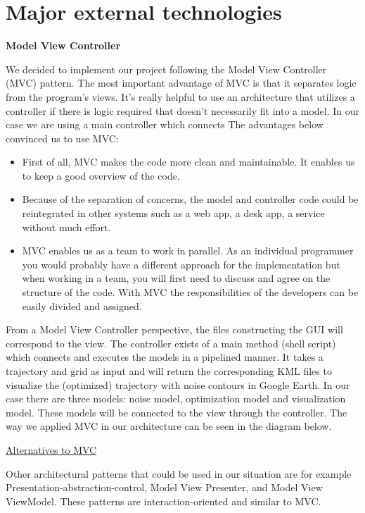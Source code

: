 \section{Major external technologies}

\textbf{Model View Controller} 

We decided to implement our project following the Model View Controller (MVC) pattern. The most important advantage of MVC is that it separates logic from the program's views. It's really helpful to use an architecture that utilizes a controller if there is logic required that doesn't necessarily fit into a model. In our case we are using a main controller which connects The advantages below convinced us to use MVC:


\begin{itemize}
\item First of all, MVC makes the code more clean and maintainable. It enables us to keep a good overview of the code.


\item Because of the separation of concerns, the model and controller code could be reintegrated in other systems such as a web app, a desk app, a service without much effort.


\item MVC enables us as a team to work in parallel. As an individual programmer you would probably have a different approach for the implementation but when working in a team, you will first need to discuss and agree on the structure of the code. With MVC the responsibilities of the developers can be easily divided and assigned.

\end{itemize}

From a Model View Controller perspective, the files constructing the GUI will correspond to the view. The controller exists of a main method (shell script) which connects and executes the models in a pipelined manner. It takes a trajectory and grid as input and will return the corresponding KML files to visualize the (optimized) trajectory with noise contours in Google Earth. In our case there are three models: noise model, optimization model and visualization model. These models will be connected to the view through the controller. The way we applied MVC in our architecture can be seen in the diagram below.


\underline{Alternatives to MVC}

Other architectural patterns that could be used in our situation are for example Presentation-abstraction-control, Model View Presenter, and Model View ViewModel. These patterns are interaction-oriented and similar to MVC.
 
